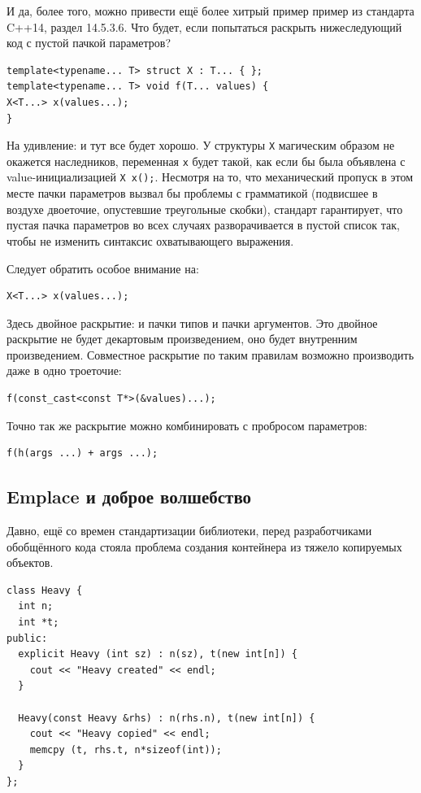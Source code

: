 \documentclass[a4paper,12pt,oneside]{book}
\begin{document}
И да, более того, можно привести ещё более хитрый пример пример из стандарта C++14, раздел 14.5.3.6. Что будет, если попытаться раскрыть нижеследующий код с пустой пачкой параметров?

\begin{lstlisting}
template<typename... T> struct X : T... { };
template<typename... T> void f(T... values) {
X<T...> x(values...);
}
\end{lstlisting}

На удивление: и тут все будет хорошо. У структуры \lstinline!X! магическим образом не окажется наследников, переменная \lstinline!x! будет такой, как если бы была объявлена с value-инициализацией \lstinline!X x();!. Несмотря на то, что механический пропуск в этом месте пачки параметров вызвал бы проблемы с грамматикой (подвисшее в воздухе двоеточие, опустевшие треугольные скобки), стандарт гарантирует, что пустая пачка параметров во всех случаях разворачивается в пустой список так, чтобы не изменить синтаксис охватывающего выражения.

Следует обратить особое внимание на:

\begin{lstlisting}
X<T...> x(values...);
\end{lstlisting}

Здесь двойное раскрытие: и пачки типов и пачки аргументов. Это двойное раскрытие не будет декартовым произведением, оно будет внутренним произведением. Совместное раскрытие по таким правилам возможно производить даже в одно троеточие:

\begin{lstlisting}
f(const_cast<const T*>(&values)...); 
\end{lstlisting}

Точно так же раскрытие можно комбинировать с пробросом параметров:

\begin{lstlisting}
f(h(args ...) + args ...);
\end{lstlisting}

\subsection{Emplace и доброе волшебство}\label{subsub:Emplace}

Давно, ещё со времен стандартизации библиотеки, перед разработчиками обобщённого кода стояла проблема создания контейнера из тяжело копируемых объектов.

\begin{lstlisting}
class Heavy {
  int n;
  int *t;
public:
  explicit Heavy (int sz) : n(sz), t(new int[n]) {
    cout << "Heavy created" << endl;
  }

  Heavy(const Heavy &rhs) : n(rhs.n), t(new int[n]) {
    cout << "Heavy copied" << endl;
    memcpy (t, rhs.t, n*sizeof(int));
  }
};
\end{lstlisting}
\end{document}
